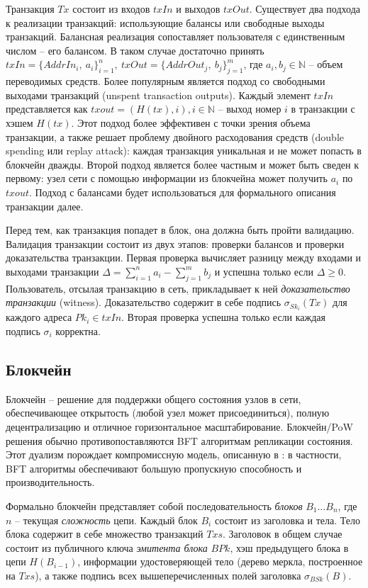 \documentclass[specification,annotation]{itmo-student-thesis}
\begin{document}
Транзакция $Tx$ состоит из входов $txIn$ и выходов $txOut$. Существует
два подхода к реализации транзакций: использующие балансы или
свободные выходы транзакций. Балансная реализация сопоставляет
пользователя с единственным числом -- его балансом. В таком случае
достаточно принять $txIn = \{AddrIn_i,\ a_i\}_{i=1}^n, \ txOut =
\{AddrOut_j,\ b_j\}_{j=1}^m$, где $a_i, b_j \in \mathbb{N}$ -- объем
переводимых средств. Более популярным является подход со свободными
выходами транзакций (unspent transaction outputs). Каждый элемент
$txIn$ представляется как $txout = (H(tx), i), i \in \mathbb{N}$ --
выход номер $i$ в транзакции с хэшем $H(tx)$. Этот подход более
эффективен с точки зрения объема транзакции, а также решает проблему
двойного расходования средств (double spending или replay attack):
каждая транзакция уникальная и не может попасть в блокчейн
дважды. Второй подход является более частным и может быть сведен к
первому: узел сети с помощью информации из блокчейна может получить
$a_i$ по $txout$. Подход с балансами будет использоваться для
формального описания транзакции далее.

Перед тем, как транзакция попадет в блок, она должна быть
пройти валидацию. Валидация транзакции состоит из двух этапов: проверки
балансов и проверки доказательства транзакции. Первая проверка
вычисляет разницу между входами и выходами транзакции $\Delta =
\sum_{i=1}^n{a_i} - \sum_{j=1}^m{b_j}$ и успешна только если $\Delta
\geq 0$. Пользователь, отсылая транзакцию в сеть, прикладывает к ней
{\it доказательство транзакции} (witness). Доказательство
содержит в себе подпись $\sigma_{Sk_i}(Tx)$ для каждого адреса
$Pk_i \in txIn$. Вторая проверка успешна только если
каждая подпись $\sigma_i$ корректна.

\subsection{Блокчейн}

Блокчейн -- решение для поддержки общего состояния узлов в сети,
обеспечивающее открытость (любой узел может присоединиться), полную
децентрализацию и отличное горизонтальное
масштабирование. Блокчейн/PoW решения обычно противопоставляются BFT
алгоритмам репликации состояния. Этот дуализм порождает компромиссную
модель, описанную в \cite{powbftquest}: в частности, BFT алгоритмы
обеспечивают большую пропускную способность и производительность.

Формально блокчейн представляет собой последовательность {\it блоков}
$B_1 \ldots B_n$, где $n$ -- текущая {\it сложность} цепи. Каждый блок
$B_i$ состоит из заголовка и тела. Тело блока содержит в себе
множество транзакций $Txs$. Заголовок в общем случае состоит из
публичного ключа {\it эмитента блока} $BPk$, хэш предыдущего блока в
цепи $H(B_{i-1})$, информации удостоверяющей тело (дерево меркла,
построенное на $Txs$), а также подпись всех вышеперечисленных полей
заголовка $\sigma_{BSk}(B)$.
\end{document}
